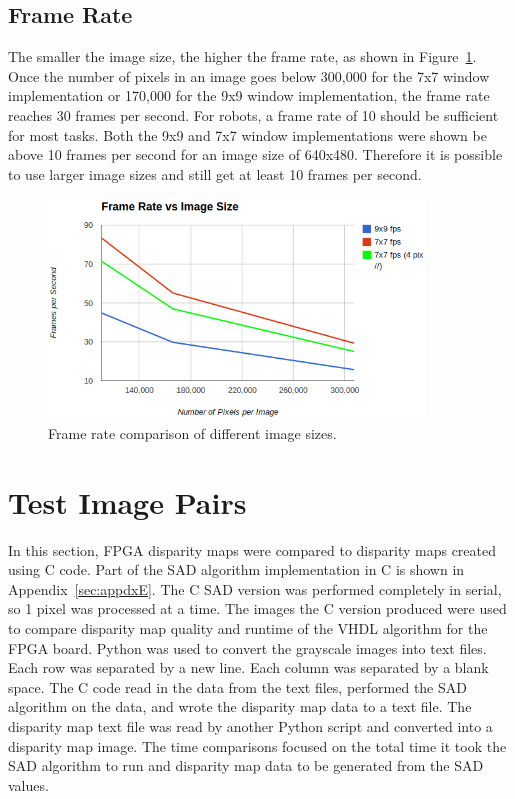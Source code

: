 \subsection{Frame Rate}
\label{sec:frameRate}

The smaller the image size, the higher the frame rate, as shown in Figure~\ref{fig:frameRate}. Once the number of pixels in an image goes below 300,000 for the 7x7 window implementation or 170,000 for the 9x9 window implementation, the frame rate reaches 30 frames per second. For robots, a frame rate of 10 should be sufficient for most tasks. Both the 9x9 and 7x7 window implementations were shown be above 10 frames per second for an image size of 640x480. Therefore it is possible to use larger image sizes and still get at least 10 frames per second.

\begin{figure}[h]
	\begin{center}
		\includegraphics[width=100mm]{figures/frameRate.png}
		\captionfonts
		\caption{Frame rate comparison of different image sizes.}
		\label{fig:frameRate}
	\end{center}
\end{figure}

\section{Test Image Pairs}
\label{sec:runtime}

In this section, FPGA disparity maps were compared to disparity maps created using C code. Part of the SAD algorithm implementation in C is shown in Appendix~\ref{sec:appdxE}. The C SAD version was performed completely in serial, so 1 pixel was processed at a time. The images the C version produced were used to compare disparity map quality and runtime of the VHDL algorithm for the FPGA board. Python was used to convert the grayscale images into text files. Each row was separated by a new line. Each column was separated by a blank space. The C code read in the data from the text files, performed the SAD algorithm on the data, and wrote the disparity map data to a text file. The disparity map text file was read by another Python script and converted into a disparity map image. The time comparisons focused on the total time it took the SAD algorithm to run and disparity map data to be generated from the SAD values.


